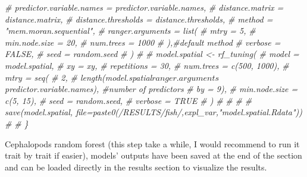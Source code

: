 \documentclass[
]{article}
\newenvironment{Shaded}{\begin{snugshade}}{\end{snugshade}}
\newcommand{\CommentTok}[1]{\textcolor[rgb]{0.56,0.35,0.01}{\textit{#1}}}
\begin{document}
\begin{Shaded}
\begin{Highlighting}[]
\CommentTok{\#       predictor.variable.names = predictor.variable.names,}
\CommentTok{\#       distance.matrix = distance.matrix,}
\CommentTok{\#       distance.thresholds = distance.thresholds,}
\CommentTok{\#       method = "mem.moran.sequential",}
\CommentTok{\#       ranger.arguments = list(}
\CommentTok{\#         mtry = 5,}
\CommentTok{\#         min.node.size = 20,}
\CommentTok{\#         num.trees = 1000}
\CommentTok{\#       ),\#default method}
\CommentTok{\#       verbose = FALSE,}
\CommentTok{\#       seed = random.seed}
\CommentTok{\#     )}
\CommentTok{\# }
\CommentTok{\# model.spatial \textless{}{-} rf\_tuning(}
\CommentTok{\#   model = model.spatial,}
\CommentTok{\#   xy = xy,}
\CommentTok{\#   repetitions = 30,}
\CommentTok{\#   num.trees = c(500, 1000),}
\CommentTok{\#   mtry = seq(}
\CommentTok{\#     2,}
\CommentTok{\#     length(model.spatial$ranger.arguments$predictor.variable.names), \#number of predictors}
\CommentTok{\#     by = 9),}
\CommentTok{\#   min.node.size = c(5, 15),}
\CommentTok{\#   seed = random.seed,}
\CommentTok{\#   verbose = TRUE}
\CommentTok{\# )}
\CommentTok{\# }
\CommentTok{\# }
\CommentTok{\# \# save(model.spatial, file=paste0(\textquotesingle{}/RESULTS/fish/\textquotesingle{},expl\_var,"model.spatial.Rdata"))}
\CommentTok{\# }
\CommentTok{\# \}}
\end{Highlighting}
\end{Shaded}

Cephalopods random forest (this step take a while, I would recommend to
run it trait by trait if easier), models' outputs have been saved at the
end of the section and can be loaded directly in the results section to
visualize the results.
\end{document}

